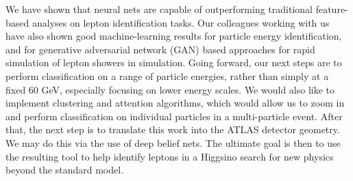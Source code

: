 We have shown that neural nets are capable of outperforming traditional feature-based analyses on lepton identification tasks. Our colleagues working with us have also shown good machine-learning results for particle energy identification, and for generative adversarial network (GAN) based approaches for rapid simulation of lepton showers in simulation. Going forward, our next steps are to perform classification on a range of particle energies, rather than simply at a fixed 60 GeV, especially focusing on lower energy scales. We would also like to implement clustering and attention algorithms, which would allow us to zoom in and perform classification on individual particles in a multi-particle event. After that, the next step is to translate this work into the ATLAS detector geometry. We may do this via the use of deep belief nets. The ultimate goal is then to use the resulting tool to help identify leptons in a Higgsino search for new physics beyond the standard model.